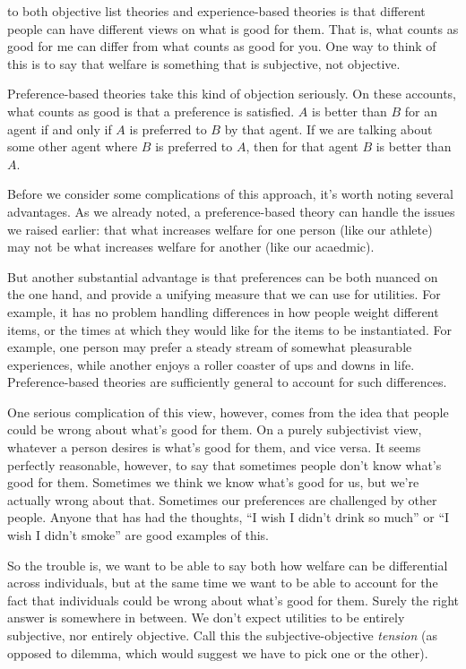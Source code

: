 \documentclass[]{tufte-book}
\begin{document}
 to both objective list theories and experience-based theories is that different people can have different views on what is good for them. That is, what counts as good for me can differ from what counts as good for you. One way to think of this is to say that welfare is something that is subjective, not objective.

Preference-based theories take this kind of objection seriously. On these accounts, what counts as good is that a preference is satisfied. \(A\) is better than \(B\) for an agent if and only if \(A\) is preferred to \(B\) by that agent. If we are talking about some other agent where \(B\) is preferred to \(A\), then for that agent \(B\) is better than \(A\).

Before we consider some complications of this approach, it's worth noting several advantages. As we already noted, a preference-based theory can handle the issues we raised earlier: that what increases welfare for one person (like our athlete) may not be what increases welfare for another (like our acaedmic).

But another substantial advantage is that preferences can be both nuanced on the one hand, and provide a unifying measure that we can use for utilities. For example, it has no problem handling differences in how people weight different items, or the times at which they would like for the items to be instantiated. For example, one person may prefer a steady stream of somewhat pleasurable experiences, while another enjoys a roller coaster of ups and downs in life. Preference-based theories are sufficiently general to account for such differences.

One serious complication of this view, however, comes from the idea that people could be wrong about what's good for them. On a purely subjectivist view, whatever a person desires is what's good for them, and vice versa. It seems perfectly reasonable, however, to say that sometimes people don't know what's good for them. Sometimes we think we know what's good for us, but we're actually wrong about that. Sometimes our preferences are challenged by other people. Anyone that has had the thoughts, ``I wish I didn't drink so much'' or ``I wish I didn't smoke'' are good examples of this.

So the trouble is, we want to be able to say both how welfare can be differential across individuals, but at the same time we want to be able to account for the fact that individuals could be wrong about what's good for them. Surely the right answer is somewhere in between. We don't expect utilities to be entirely subjective, nor entirely objective. Call this the subjective-objective \emph{tension} (as opposed to dilemma, which would suggest we have to pick one or the other).
\end{document}
